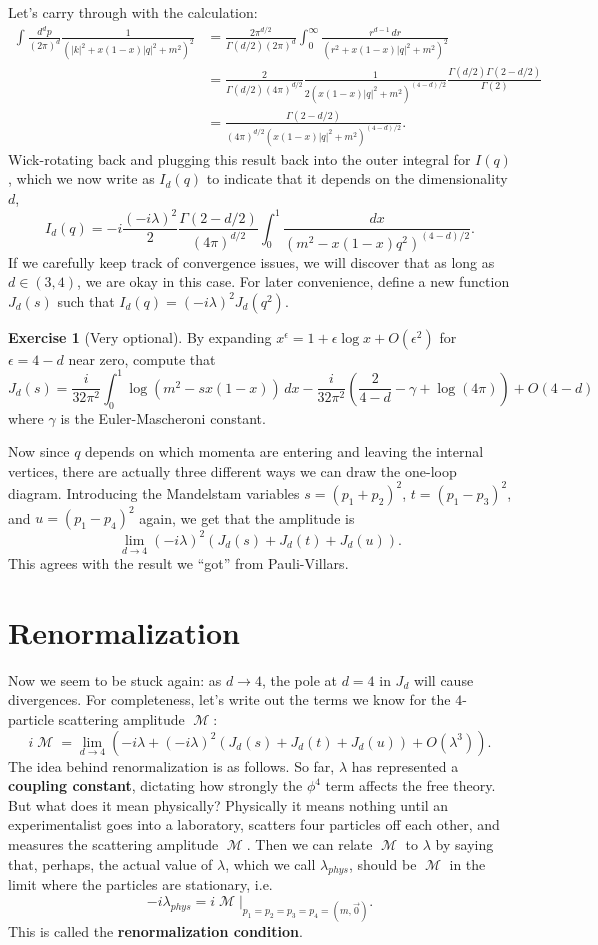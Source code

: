 \documentclass{report}
\theoremstyle{plain}
\theoremstyle{definition}
\newtheorem{exercise}{Exercise}[section]
\theoremstyle{remark}
\DeclareMathOperator{\cM}{\mathcal{M}}
\begin{document}
Let's carry through with the calculation:
\begin{align*}
  \int \frac{d^dp}{(2\pi)^d} \frac{1}{(|k|^2 + x(1 - x)|q|^2 + m^2)^2}
  &= \frac{2\pi^{d/2}}{\Gamma(d/2)(2\pi)^d} \int_0^\infty \frac{r^{d-1} \, dr}{(r^2 + x(1-x)|q|^2 + m^2)^2} \\
  &= \frac{2}{\Gamma(d/2) (4\pi)^{d/2}} \frac{1}{2(x(1-x)|q|^2 + m^2)^{(4-d)/2}} \frac{\Gamma(d/2) \Gamma(2 - d/2)}{\Gamma(2)} \\
  &= \frac{\Gamma(2-d/2)}{(4\pi)^{d/2} (x(1-x)|q|^2 + m^2)^{(4-d)/2}}.
\end{align*}
Wick-rotating back and plugging this result back into the outer
integral for $I(q)$, which we now write as $I_d(q)$ to indicate that
it depends on the dimensionality $d$,
$$ I_d(q) = -i\frac{(-i\lambda)^2}{2} \frac{\Gamma(2 - d/2)}{(4\pi)^{d/2}} \int_0^1 \frac{dx}{(m^2 - x(1-x)q^2)^{(4-d)/2}}. $$
If we carefully keep track of convergence issues, we will discover
that as long as $d \in (3, 4)$, we are okay in this case. For later
convenience, define a new function $J_d(s)$ such that
$I_d(q) = (-i\lambda)^2 J_d(q^2)$.

\begin{exercise}[Very optional]
  By expanding $x^\epsilon = 1 + \epsilon \log x + O(\epsilon^2)$ for
  $\epsilon = 4 - d$ near zero, compute that
  $$ J_d(s) = \frac{i}{32\pi^2} \int_0^1 \log(m^2 - sx(1-x)) \, dx - \frac{i}{32\pi^2}\left(\frac{2}{4-d} - \gamma + \log(4\pi)\right) + O(4-d) $$
  where $\gamma$ is the Euler-Mascheroni constant.
\end{exercise}

Now since $q$ depends on which momenta are entering and leaving the
internal vertices, there are actually three different ways we can draw
the one-loop diagram. Introducing the Mandelstam variables
$s = (p_1 + p_2)^2$, $t = (p_1 - p_3)^2$, and $u = (p_1 - p_4)^2$
again, we get that the amplitude is
$$ \lim_{d \to 4} (-i\lambda)^2(J_d(s) + J_d(t) + J_d(u)). $$
This agrees with the result we ``got'' from Pauli-Villars.

\section{Renormalization}

Now we seem to be stuck again: as $d \to 4$, the pole at $d = 4$ in
$J_d$ will cause divergences. For completeness, let's write out the
terms we know for the $4$-particle scattering amplitude $\cM$:
$$ i\cM = \lim_{d \to 4} \left(-i\lambda + (-i\lambda)^2(J_d(s) + J_d(t) + J_d(u)) + O(\lambda^3)\right). $$
The idea behind renormalization is as follows. So far, $\lambda$ has
represented a {\bf coupling constant}, dictating how strongly the
$\phi^4$ term affects the free theory. But what does it mean
physically? Physically it means nothing until an experimentalist goes
into a laboratory, scatters four particles off each other, and
measures the scattering amplitude $\cM$. Then we can relate $\cM$ to
$\lambda$ by saying that, perhaps, the actual value of $\lambda$,
which we call $\lambda_{phys}$, should be $\cM$ in the limit where the
particles are stationary, i.e.
$$ -i\lambda_{phys} = i\cM|_{p_1=p_2=p_3=p_4=(m,\vec{0})}. $$
This is called the {\bf renormalization condition}.
\end{document}
